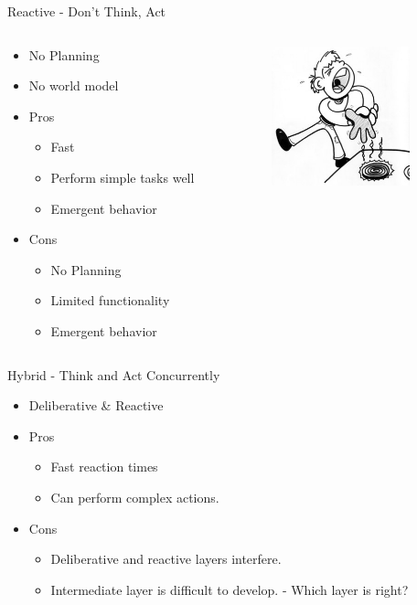 \documentclass{beamer}
\begin{document}
\begin{frame}{Reactive - Don't Think, Act}
 \begin{columns}[T]
  \begin{column}[T]{6cm}
  \begin{itemize}
    \item No Planning
    \item No world model
    \item Pros
    \begin{itemize}
    \item Fast
    \item Perform simple tasks well
    \item Emergent behavior
    \end{itemize}
    \item Cons
    \begin{itemize}
    \item No Planning
    \item Limited functionality
    \item Emergent behavior
    \end{itemize}
  \end{itemize}
  \end{column}
  \begin{column}[T]{4cm}
  \centering
   \includegraphics[width=4cm]{stove.jpg}
  \end{column}
 \end{columns}
\end{frame}

\begin{frame}{Hybrid - Think and Act Concurrently}
 \begin{itemize}
  \item Deliberative \& Reactive
  \item Pros
  \begin{itemize}
   \item Fast reaction times
   \item Can perform complex actions.
  \end{itemize}
  \item Cons
  \begin{itemize}
   \item Deliberative and reactive layers interfere.
   \item Intermediate layer is difficult to develop. - Which layer is right?
  \end{itemize}
 \end{itemize}
\end{frame}
\end{document}
